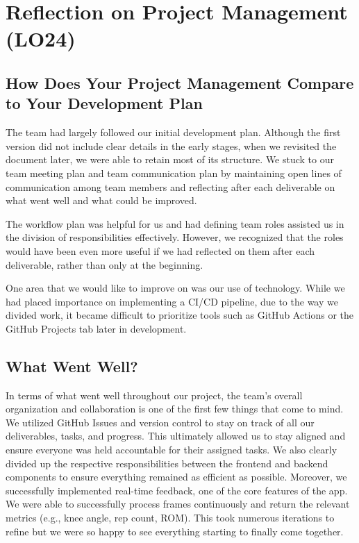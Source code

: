 \documentclass{article}
\begin{document}
\section{Reflection on Project Management (LO24)}

\subsection{How Does Your Project Management Compare to Your Development Plan}

The team had largely followed our initial development plan. Although the first version did not include clear details in the early stages, when we revisited the document later, we were able to retain most of its structure. We stuck to our team meeting plan and team communication plan by maintaining open lines of communication among team members and reflecting after each deliverable on what went well and what could be improved.

The workflow plan was helpful for us and had defining team roles assisted us in the division of responsibilities effectively. However, we recognized that the roles would have been even more useful if we had reflected on them after each deliverable, rather than only at the beginning.

One area that we would like to improve on was our use of technology. While we had placed importance on implementing a CI/CD pipeline, due to the way we divided work, it became difficult to prioritize tools such as GitHub Actions or the GitHub Projects tab later in development.

\subsection{What Went Well?}

In terms of what went well throughout our project, the team’s overall organization and collaboration 
is one of the first few things that come to mind. We utilized GitHub Issues and version control to stay
on track of all our deliverables, tasks, and progress. This ultimately allowed us to stay aligned and 
ensure everyone was held accountable for their assigned tasks. We also clearly divided up the respective
responsibilities between the frontend and backend components to ensure everything remained as efficient 
as possible. Moreover, we successfully implemented real-time feedback, one of the core features of 
the app. We were able to successfully process frames continuously and return the relevant metrics 
(e.g., knee angle, rep count, ROM). This took numerous iterations to refine but we were so happy to 
see everything starting to finally come together.
\end{document}
